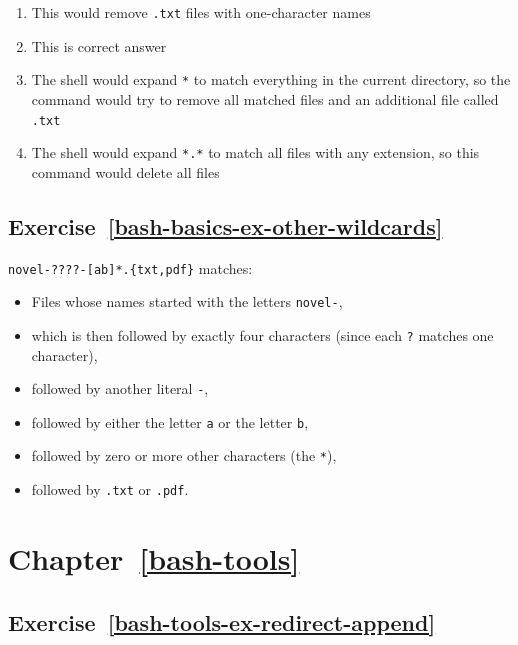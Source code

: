 \documentclass[
]{krantz}
\providecommand{\tightlist}{%
  \setlength{\itemsep}{0pt}\setlength{\parskip}{0pt}}
\begin{document}
\begin{enumerate}
\def\labelenumi{\arabic{enumi}.}
\tightlist
\item
  This would remove \texttt{.txt} files with one-character names
\item
  This is correct answer
\item
  The shell would expand \texttt{*} to match everything in the current directory,
  so the command would try to remove all matched files and an additional
  file called \texttt{.txt}
\item
  The shell would expand \texttt{*.*} to match all files with any extension,
  so this command would delete all files
\end{enumerate}

\hypertarget{exercise-refbash-basics-ex-other-wildcards}{%
\subsection*{Exercise~\ref{bash-basics-ex-other-wildcards}}\label{exercise-refbash-basics-ex-other-wildcards}}


\texttt{novel-????-{[}ab{]}*.\{txt,pdf\}} matches:

\begin{itemize}
\tightlist
\item
  Files whose names started with the letters \texttt{novel-},
\item
  which is then followed by exactly four characters
  (since each \texttt{?} matches one character),
\item
  followed by another literal \texttt{-},
\item
  followed by either the letter \texttt{a} or the letter \texttt{b},
\item
  followed by zero or more other characters (the \texttt{*}),
\item
  followed by \texttt{.txt} or \texttt{.pdf}.
\end{itemize}

\hypertarget{chapter-refbash-tools}{%
\section*{Chapter~\ref{bash-tools}}\label{chapter-refbash-tools}}

\hypertarget{exercise-refbash-tools-ex-redirect-append}{%
\subsection*{Exercise~\ref{bash-tools-ex-redirect-append}}\label{exercise-refbash-tools-ex-redirect-append}}
\end{document}
